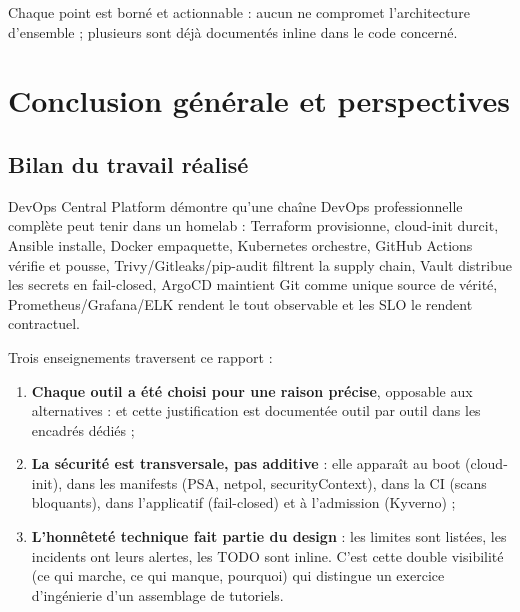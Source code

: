 \documentclass[12pt,a4paper,twoside,openright]{report}
\makeatletter
\def\cleardoublepage{\clearpage\if@twoside
  \ifodd\c@page\else\hbox{}\thispagestyle{empty}\newpage\fi\fi}
\makeatother
\begin{document}
Chaque point est borné et actionnable : aucun ne compromet l'architecture d'ensemble ; plusieurs sont déjà documentés inline dans le code concerné.


\cleardoublepage
\chapter*{Conclusion générale et perspectives}

\section*{Bilan du travail réalisé}


DevOps Central Platform démontre qu'une chaîne DevOps professionnelle complète peut tenir dans un homelab : Terraform provisionne, cloud-init durcit, Ansible installe, Docker empaquette, Kubernetes orchestre, GitHub Actions vérifie et pousse, Trivy/Gitleaks/pip-audit filtrent la supply chain, Vault distribue les secrets en fail-closed, ArgoCD maintient Git comme unique source de vérité, Prometheus/Grafana/ELK rendent le tout observable et les SLO le rendent contractuel.

Trois enseignements traversent ce rapport :

\begin{enumerate}[itemsep=2pt]
  \item \textbf{Chaque outil a été choisi pour une raison précise}, opposable aux alternatives : et cette justification est documentée outil par outil dans les encadrés dédiés ;
  \item \textbf{La sécurité est transversale, pas additive} : elle apparaît au boot (cloud-init), dans les manifests (PSA, netpol, securityContext), dans la CI (scans bloquants), dans l'applicatif (fail-closed) et à l'admission (Kyverno) ;
  \item \textbf{L'honnêteté technique fait partie du design} : les limites sont listées, les incidents ont leurs alertes, les TODO sont inline. C'est cette double visibilité (ce qui marche, ce qui manque, pourquoi) qui distingue un exercice d'ingénierie d'un assemblage de tutoriels.
\end{enumerate}
\end{document}
